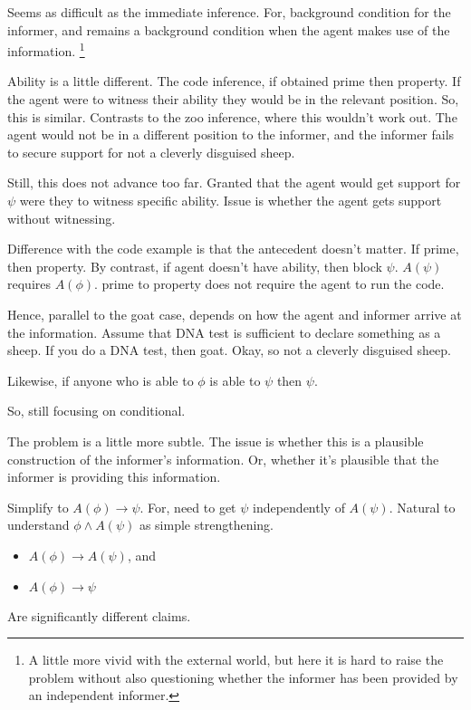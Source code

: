 \documentclass[10pt]{article}
\begin{document}
Seems as difficult as the immediate inference.
For, background condition for the informer, and remains a background condition when the agent makes use of the information.\nolinebreak
\footnote{
  A little more vivid with the external world, but here it is hard to raise the problem without also questioning whether the informer has been provided by an independent informer.
}

Ability is a little different.
The code inference, if obtained prime then property.
If the agent were to witness their ability they would be in the relevant position.
So, this is similar.
Contrasts to the zoo inference, where this wouldn't work out.
The agent would not be in a different position to the informer, and the informer fails to secure support for not a cleverly disguised sheep.

Still, this does not advance too far.
Granted that the agent would get support for \(\psi\) were they to witness specific ability.
Issue is whether the agent gets support without witnessing.

Difference with the code example is that the antecedent doesn't matter.
If prime, then property.
By contrast, if agent doesn't have ability, then block \(\psi\).
\(A(\psi)\) requires \(A(\phi)\).
prime to property does not require the agent to run the code.

Hence, parallel to the goat case, depends on how the agent and informer arrive at the information.
Assume that DNA test is sufficient to declare something as a sheep.
If you do a DNA test, then goat.
Okay, so not a cleverly disguised sheep.

Likewise, if anyone who is able to \(\phi\) is able to \(\psi\) then \(\psi\).

So, still focusing on conditional.

The problem is a little more subtle.
The issue is whether this is a plausible construction of the informer's information.
Or, whether it's plausible that the informer is providing this information.

Simplify to \(A(\phi) \rightarrow \psi\).
For, need to get \(\psi\) independently of \(A(\psi)\).
Natural to understand \(\phi \land A(\psi)\) as simple strengthening.

\begin{itemize}
\item \(A(\phi) \rightarrow A(\psi)\), and
\item \(A(\phi) \rightarrow \psi\)
\end{itemize}
Are significantly different claims.
\end{document}
